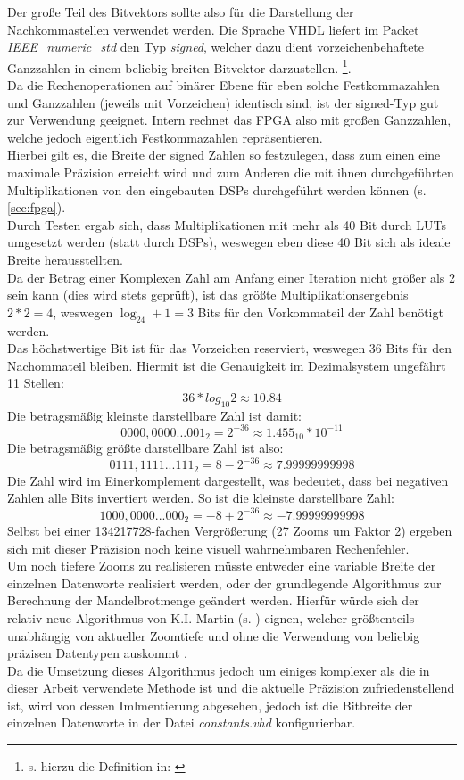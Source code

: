 \documentclass[a4paper,12pt,onesided]{report}
\begin{document}
Der große Teil des Bitvektors sollte also für die Darstellung der Nachkommastellen verwendet werden.
Die Sprache VHDL liefert im Packet \textit{IEEE\_numeric\_std} den Typ \textit{signed}, welcher dazu dient vorzeichenbehaftete Ganzzahlen in einem beliebig breiten Bitvektor darzustellen. \footnote{s. hierzu die Definition in: \cite{ieeeNumeric}}.\\
Da die Rechenoperationen auf binärer Ebene für eben solche Festkommazahlen und Ganzzahlen (jeweils mit Vorzeichen) identisch sind, ist der signed-Typ gut zur Verwendung geeignet.
Intern rechnet das FPGA also mit großen Ganzzahlen, welche jedoch eigentlich Festkommazahlen repräsentieren.\\
Hierbei gilt es, die Breite der signed Zahlen so festzulegen, dass zum einen eine maximale Präzision erreicht wird und zum Anderen die mit ihnen durchgeführten Multiplikationen von den eingebauten DSPs durchgeführt werden können (s. \autoref{sec:fpga}).\\
Durch Testen ergab sich, dass Multiplikationen mit mehr als 40 Bit durch LUTs umgesetzt werden (statt durch DSPs), weswegen eben diese 40 Bit sich als ideale Breite herausstellten.\\
Da der Betrag einer Komplexen Zahl am Anfang einer Iteration nicht größer als 2 sein kann (dies wird stets geprüft), ist das größte Multiplikationsergebnis $2*2=4$, weswegen $\log_24+1=3$ Bits für den Vorkommateil der Zahl benötigt werden.\\
Das höchstwertige Bit ist für das Vorzeichen reserviert, weswegen 36 Bits für den Nachommateil bleiben. Hiermit ist die Genauigkeit im Dezimalsystem ungefährt 11 Stellen:
\[36 * log_{10}2 \approx 10.84\]
Die betragsmäßig kleinste darstellbare Zahl ist damit:
\[0000,0000...001_2 = 2^{-36} \approx 1.455_{10}*10^{-11} \]
Die betragsmäßig größte darstellbare Zahl ist also:
\[0111,1111...111_2 = 8 - 2^{-36} \approx 7.99999999998 \]
Die Zahl wird im Einerkomplement dargestellt, was bedeutet, dass bei negativen Zahlen alle Bits invertiert werden. So ist die kleinste darstellbare Zahl:
\[1000,0000...000_2 = -8 + 2^{-36} \approx -7.99999999998 \]
Selbst bei einer 134217728-fachen Vergrößerung (27 Zooms um Faktor 2) ergeben sich mit dieser Präzision noch keine visuell wahrnehmbaren Rechenfehler.\\
Um noch tiefere Zooms zu realisieren müsste entweder eine variable Breite der einzelnen Datenworte realisiert werden, oder der grundlegende Algorithmus zur Berechnung der Mandelbrotmenge geändert werden.
Hierfür würde sich der relativ neue Algorithmus von K.I. Martin (s. \cite{SUPERFRACTALTHINGMATHS}) eignen, welcher größtenteils unabhängig von aktueller Zoomtiefe und ohne die Verwendung von beliebig präzisen Datentypen auskommt \cite{SUPERFRACTALTHINGMATHS}.\\
Da die Umsetzung dieses Algorithmus jedoch um einiges komplexer als die in dieser Arbeit verwendete Methode ist und die aktuelle Präzision zufriedenstellend ist, wird von dessen Imlmentierung abgesehen, jedoch ist die Bitbreite der einzelnen Datenworte in der Datei \textit{constants.vhd} konfigurierbar.\\
\end{document}
